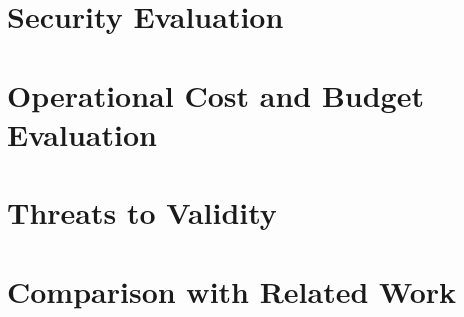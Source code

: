 \documentclass[a4paper,twoside]{sapthesis}
\begin{document}
\section{Security Evaluation}
\label{sec:security-eval}

\section{Operational Cost and Budget Evaluation}
\label{sec:cost-eval}

\section{Threats to Validity}
\label{sec:threats-validity}

\section{Comparison with Related Work}
\label{sec:comparison}
\end{document}
